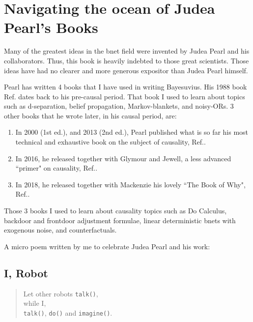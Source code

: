 \chapter*{Navigating 
the ocean of Judea Pearl's Books}
\label{ch0-nav-pearl}
Many
of the
greatest ideas 
in the bnet field 
were invented by Judea Pearl
and his collaborators.
Thus, this book is 
heavily indebted to
those great scientists.
Those ideas have had no clearer
and more generous 
expositor than Judea Pearl
himself.

Pearl has written
4 books that I have used
in writing Bayesuvius.
His 
1988 book Ref.\cite{pearl-1988book}
dates back to his pre-causal period.
That book I used to learn
about topics such as
d-separation, belief propagation,
Markov-blankets, and noisy-ORs.
3 other books that  he  wrote later,
in his causal period, 
are:
\begin{enumerate}
\item
In 2000 (1st ed.), and 2013 (2nd ed.),
Pearl published what
is so far
his most technical
and exhaustive book
on the subject of causality,
Ref.\cite{pearl-2013book}.
\item
In 2016,
he released 
together
with Glymour and Jewell,
a less advanced ``primer"
on causality, Ref.\cite{pearl-primer}.
\item
In 2018, 
he released 
together with
Mackenzie his
lovely  ``The Book of Why",
 Ref.\cite{book-why}.
\end{enumerate}
Those 3 books I used to learn
about causality topics
such as Do Calculus,
backdoor and frontdoor
adjustment formulae,
linear 
deterministic 
bnets with exogenous noise,
and counterfactuals.

A micro poem written by me
to celebrate Judea Pearl and 
his work:
 
\section*{I, Robot}
\begin{verse}
Let other robots {\tt talk()},\\
while I,\\
{\tt talk()}, {\tt do()} and {\tt imagine()}.
\end{verse}
